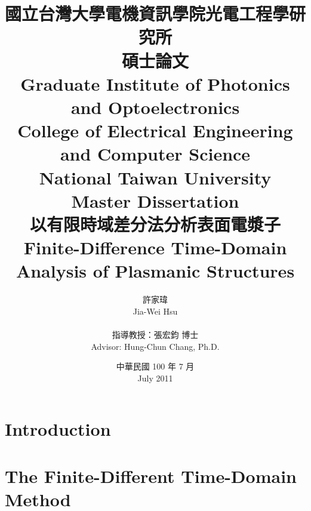\documentclass{book}
\begin{document}
\title{
  \kai 國立台灣大學電機資訊學院光電工程學研究所\\碩士論文\\
  \rm Graduate Institute of Photonics and Optoelectronics\\College of Electrical Engineering and Computer Science\\National Taiwan University\\Master Dissertation\\[1cm]
  \kai 以有限時域差分法分析表面電漿子\\
  \rm Finite-Difference Time-Domain Analysis of Plasmanic Structures
}
\author{
  \kai 許家瑋\\ \rm Jia-Wei Hsu\\\\
  \kai 指導教授：張宏鈞 博士\\ \rm Advisor: Hung-Chun Chang, Ph.D.
}
\date{
  \kai 中華民國 100 年 7 月\\ 
  \rm July 2011
}

\maketitle
{}
\tableofcontents


\chapter{Introduction}



\chapter{The Finite-Different Time-Domain Method}



\end{document}
